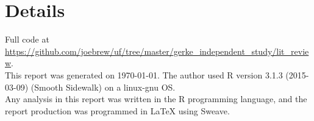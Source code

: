 \documentclass[11pt]{article}
\begin{document}
{}



\section*{Details}
\hrulefill

\vspace{10mm}
Full code at \href{https://github.com/joebrew/uf/tree/master/gerke\_independent\_study/lit\_review}{https://github.com/joebrew/uf/tree/master/gerke\_independent\_study/lit\_review}. \\

This report was generated on \today.  The author used R version 3.1.3 (2015-03-09) (Smooth Sidewalk) on a linux-gnu OS.  \\

Any analysis in this report was written in the R programming language, and the report production was programmed in \LaTeX{} using Sweave.\\
\end{document}
